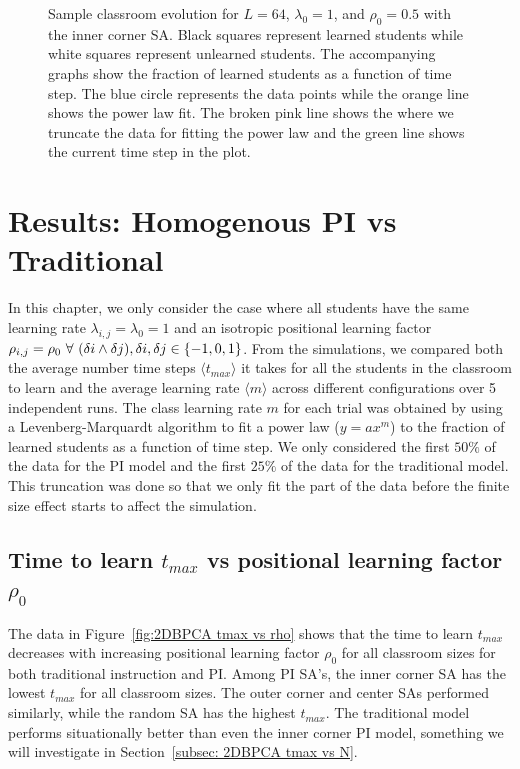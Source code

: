\begin{figure}[htbp!]
    \caption{Sample classroom evolution for $L=64$, $\lambda_0 = 1$, and $\rho_0 = 0.5$ with the inner corner SA. 
    Black squares represent learned students while white squares represent unlearned students. 
    The accompanying graphs show the fraction of learned students as a function of time step. 
    The blue circle represents the data points while the orange line shows the power law fit. 
    The broken pink line shows the where we truncate the data for fitting the power law and the green line shows the current time step in the plot.}
    \label{fig:Sample classroom evolution}
 \end{figure}

\section{Results: Homogenous PI vs Traditional}
In this chapter, we only consider the case where all students have the same learning rate $\lambda_{i,j} = \lambda_0 = 1$ and an isotropic positional learning factor $\rho_{i,j} = \rho_0 \space ~\forall~ (\delta i \land \delta j),  \delta i, \delta j \in \lbrace -1,0,1 \rbrace $. 
From the simulations, we compared both the average number time steps $\langle t_{max} \rangle$ it takes for all the students in the classroom to learn and the average learning rate $\langle m \rangle$ across different configurations over 5 independent runs.
 The class learning rate $m$ for each trial was obtained by using a Levenberg-Marquardt algorithm to fit a power law ($y = ax^m$) to the fraction of learned students as a function of time step. 
 We only considered the first $50\%$ of the data for the PI model and the first $25\%$ of the data for the traditional model. 
This truncation was done so that we only fit the part of the data before the finite size effect starts to affect the simulation.

\subsection{Time to learn $t_{max}$ vs positional learning factor $\rho_0$} \label{subsec: 2DBPCA tmax vs rho}

The data in Figure~\ref{fig:2DBPCA tmax vs rho} shows that the time to learn $t_{max}$ decreases with increasing positional learning factor $\rho_0$ for all classroom sizes for both traditional instruction and PI. 
Among PI SA's, the inner corner SA has the lowest $t_{max}$ for all classroom sizes. 
The outer corner and center SAs performed similarly, while the random SA has the highest $t_{max}$. 
The traditional model performs situationally better than even the inner corner PI model, something we will investigate in Section~\ref{subsec: 2DBPCA tmax vs N}.


